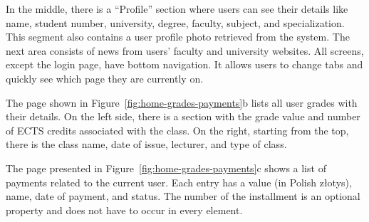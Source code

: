 In the middle, there is a ``Profile'' section where users can see their details like name, student number, university, degree, faculty, subject, and specialization. This segment also contains a user profile photo retrieved from the system. The next area consists of news from users' faculty and university websites.
All screens, except the login page, have bottom navigation. It allows users to change tabs and quickly see which page they are currently on.

The page shown in Figure~\ref{fig:home-grades-payments}b lists all user grades with their details. On the left side, there is a section with the grade value and number of ECTS credits associated with the class. On the right, starting from the top, there is the class name, date of issue, lecturer, and type of class.

The page presented in  Figure~\ref{fig:home-grades-payments}c shows a list of payments related to the current user. Each entry has a value (in Polish złotys), name, date of payment, and status. The number of the installment is an optional property and does not have to occur in every element.

